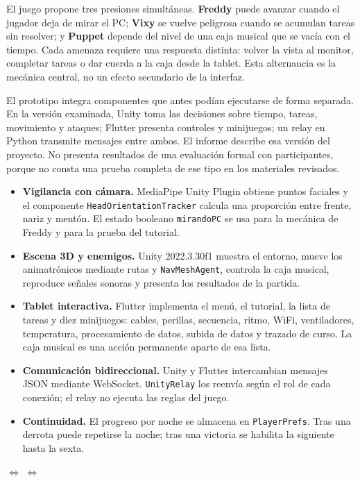 \documentclass[11pt,a4paper]{article}
\newcommand{\codigo}[1]{\texttt{#1}}
\newcommand{\dato}[1]{\textcolor{Azul}{\bfseries #1}}
\begin{document}
El juego propone tres presiones simultáneas. \dato{Freddy} puede avanzar cuando el jugador deja de mirar el PC; \dato{Vixy} se vuelve peligrosa cuando se acumulan tareas sin resolver; y \dato{Puppet} depende del nivel de una caja musical que se vacía con el tiempo. Cada amenaza requiere una respuesta distinta: volver la vista al monitor, completar tareas o dar cuerda a la caja desde la tablet. Esta alternancia es la mecánica central, no un efecto secundario de la interfaz.

El prototipo integra componentes que antes podían ejecutarse de forma separada. En la versión examinada, Unity toma las decisiones sobre tiempo, tareas, movimiento y ataques; Flutter presenta controles y minijuegos; un relay en Python transmite mensajes entre ambos. El informe describe esa versión del proyecto. No presenta resultados de una evaluación formal con participantes, porque no consta una prueba completa de ese tipo en los materiales revisados.
\begin{itemize}
  \item \textbf{Vigilancia con cámara.} MediaPipe Unity Plugin obtiene puntos faciales y el componente \codigo{HeadOrientationTracker} calcula una proporción entre frente, nariz y mentón. El estado booleano \codigo{mirandoPC} se usa para la mecánica de Freddy y para la prueba del tutorial.
  \item \textbf{Escena 3D y enemigos.} Unity 2022.3.30f1 muestra el entorno, mueve los animatrónicos mediante rutas y \codigo{NavMeshAgent}, controla la caja musical, reproduce señales sonoras y presenta los resultados de la partida.
  \item \textbf{Tablet interactiva.} Flutter implementa el menú, el tutorial, la lista de tareas y diez minijuegos: cables, perillas, secuencia, ritmo, WiFi, ventiladores, temperatura, procesamiento de datos, subida de datos y trazado de curso. La caja musical es una acción permanente aparte de esa lista.
  \item \textbf{Comunicación bidireccional.} Unity y Flutter intercambian mensajes JSON mediante WebSocket. \codigo{UnityRelay} los reenvía según el rol de cada conexión; el relay no ejecuta las reglas del juego.
  \item \textbf{Continuidad.} El progreso por noche se almacena en \codigo{PlayerPrefs}. Tras una derrota puede repetirse la noche; tras una victoria se habilita la siguiente hasta la sexta.
\end{itemize}

\begin{center}
\small
{}
\quad$\Longleftrightarrow$\quad
{}
\quad$\Longleftrightarrow$\quad
{}
\end{center}
\end{document}
